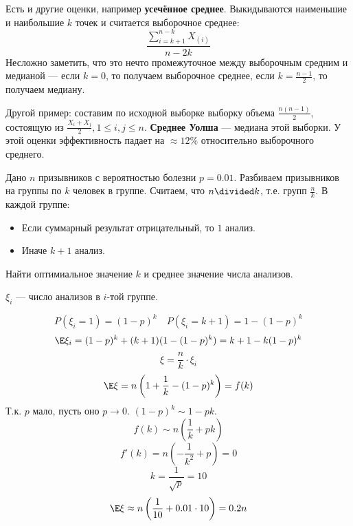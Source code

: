 Есть и другие оценки, например \textbf{усечённое среднее}. Выкидываются наименьшие и наибольшие \(k\) точек и считается выборочное среднее:
\[\frac{\sum\limits_{i= k + 1}^{n - k} X_{(i)}}{n - 2k}\]
Несложно заметить, что это нечто промежуточное между выборочным средним и медианой --- если \(k = 0\), то получаем выборочное среднее, если \(k = \frac{n - 1}{2}\), то получаем медиану.

Другой пример: составим по исходной выборке выборку объема \(\frac{n(n - 1)}{2}\), состоящую из \(\frac{X_i + X_j}{2}, 1 \leq i,j \leq n\). \textbf{Среднее Уолша} --- медиана этой выборки. У этой оценки эффективность падает на \(\approx 12\%\) относительно выборочного среднего.

\begin{exercise}
    Дано \(n\) призывников с вероятностью болезни \(p = 0.01\). Разбиваем призывников на группы по \(k\) человек в группе. Считаем, что \(n \divided k\), т.е. групп \(\frac{n}{k}\). В каждой группе:
    \begin{itemize}
        \item Если суммарный результат отрицательный, то \(1\) анализ.
        \item Иначе \(k + 1\) анализ.
    \end{itemize}

    Найти оптимиальное значение \(k\) и среднее значение числа анализов.
\end{exercise}
\begin{solution}
    \(\xi_i\) --- число анализов в \(i\)-той группе.

    \[P(\xi_i = 1) = (1 - p)^k \quad P(\xi_i = k + 1) = 1 - (1 - p)^k\]
    \[\E \xi_i = (1 - p)^k + (k + 1)(1 - (1 - p)^k) = k + 1 - k(1 - p)^k\]
    \[\xi = \frac{n}{k} \cdot \xi_i\]
    \[\E \xi = n\left(1 + \frac{1}{k} - (1 - p)^k\right) = f(k)\]
    Т.к. \(p\) мало, пусть оно \(p \to 0\). \((1 - p)^k \sim 1 - pk\).
    \[f(k) \sim n \left(\frac{1}{k} + pk\right)\]
    \[f'(k) = n \left( - \frac{1}{k^2} + p \right) = 0\]
    \[k = \frac{1}{\sqrt{p}} = 10\]
    \[\E \xi \approx n \left(\frac{1}{10} + 0.01 \cdot 10\right) = 0.2 n\]
\end{solution}
